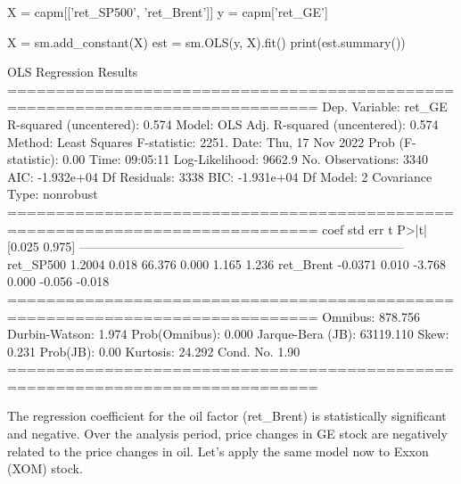 \begin{ipython}
X = capm[['ret_SP500', 'ret_Brent']]
y = capm['ret_GE']

X = sm.add_constant(X)
est = sm.OLS(y, X).fit()
print(est.summary())
\end{ipython} 
\begin{ioutput}
OLS Regression Results                                
==============================================================================
Dep. Variable:                 ret_GE   R-squared (uncentered):          0.574
Model:                            OLS   Adj. R-squared (uncentered):     0.574
Method:                 Least Squares   F-statistic:                     2251.
Date:                Thu, 17 Nov 2022   Prob (F-statistic):               0.00
Time:                        09:05:11   Log-Likelihood:                 9662.9
No. Observations:                3340   AIC:                        -1.932e+04
Df Residuals:                    3338   BIC:                        -1.931e+04
Df Model:                           2                                                  
Covariance Type:            nonrobust                                                  
==============================================================================
coef    std err          t      P>|t|      [0.025      0.975]
------------------------------------------------------------------------------
ret_SP500      1.2004      0.018     66.376      0.000       1.165       1.236
ret_Brent     -0.0371      0.010     -3.768      0.000      -0.056      -0.018
==============================================================================
Omnibus:                      878.756   Durbin-Watson:                   1.974
Prob(Omnibus):                  0.000   Jarque-Bera (JB):            63119.110
Skew:                           0.231   Prob(JB):                         0.00
Kurtosis:                      24.292   Cond. No.                         1.90
==============================================================================
\end{ioutput}

The regression coefficient for the oil factor (ret\_Brent) is statistically significant and negative. Over the analysis period, price changes in GE stock are negatively related to the price changes in oil.
Let's apply the same model now to Exxon (XOM) stock.

